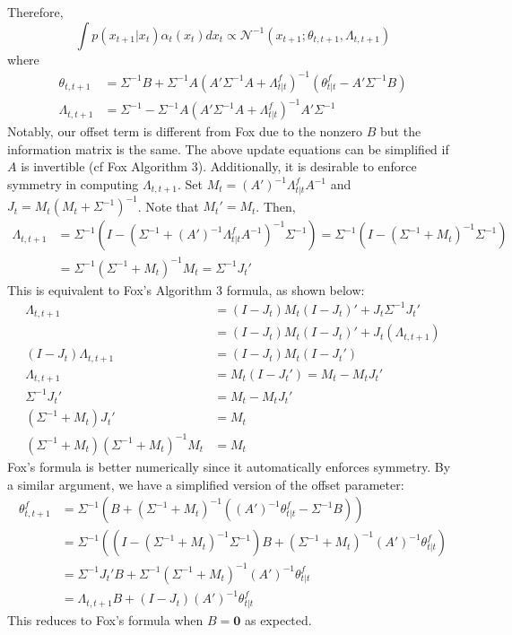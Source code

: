 \documentclass{article} %
\begin{document}
Therefore,
\[\int p(x_{t+1}|x_t)\alpha_t(x_t)dx_t \propto \mathcal{N}^{-1}(x_{t+1};\theta_{t,t+1},\Lambda_{t,t+1})\]
where
\begin{align*}
\theta_{t,t+1} &=\Sigma^{-1}B + \Sigma^{-1}A(A'\Sigma^{-1}A+\Lambda^f_{t|t})^{-1}(\theta^f_{t|t} - A'\Sigma^{-1}B)\\
\Lambda_{t,t+1} &= \Sigma^{-1} - \Sigma^{-1}A(A'\Sigma^{-1}A+\Lambda^f_{t|t})^{-1}A'\Sigma^{-1}
\end{align*}
Notably, our offset term is different from Fox due to the nonzero $B$ but the information matrix is the same. The above update equations can be simplified if $A$ is invertible (cf Fox Algorithm 3). Additionally, it is desirable to enforce symmetry in computing $\Lambda_{t,t+1}$. Set $M_t = (A')^{-1}\Lambda^f_{t|t}A^{-1}$ and $J_t = M_t(M_t+\Sigma^{-1})^{-1}$. Note that $M_t' = M_t$. Then,
\begin{align*}
\Lambda_{t,t+1} &= \Sigma^{-1}\left(I - \left(\Sigma^{-1}+(A')^{-1}\Lambda^f_{t|t}A^{-1}\right)^{-1}\Sigma^{-1}\right) = \Sigma^{-1}\left(I - \left(\Sigma^{-1}+M_t\right)^{-1}\Sigma^{-1}\right)\\
&=\Sigma^{-1}\left(\Sigma^{-1}+M_t\right)^{-1}M_t = \Sigma^{-1}J_t'
\end{align*}
This is equivalent to Fox's Algorithm 3 formula, as shown below:
\begin{align*}
\Lambda_{t,t+1} &= (I-J_t)M_t(I-J_t)' + J_t\Sigma^{-1}J_t'\\
 &= (I-J_t)M_t(I-J_t)' + J_t(\Lambda_{t,t+1})\\
 (I-J_t)\Lambda_{t,t+1} &= (I-J_t)M_t(I-J_t')\\
 \Lambda_{t,t+1} &= M_t(I-J_t') = M_t-M_tJ_t'\\
 \Sigma^{-1}J_t' &= M_t-M_tJ_t'\\
 (\Sigma^{-1} + M_t)J_t' &= M_t\\
 (\Sigma^{-1}+M_t)(\Sigma^{-1}+M_t)^{-1}M_t &= M_t
\end{align*}
Fox's formula is better numerically since it automatically enforces symmetry. By a similar argument, we have a simplified version of the offset parameter:
\begin{align*}
\theta^f_{t,t+1} &= \Sigma^{-1}\left(B+\left(\Sigma^{-1}+M_t\right)^{-1}\left((A')^{-1}\theta^f_{t|t} - \Sigma^{-1}B\right)\right)\\
&= \Sigma^{-1}\left(\left(I-(\Sigma^{-1}+M_t)^{-1}\Sigma^{-1}\right)B + \left(\Sigma^{-1}+M_t\right)^{-1}(A')^{-1}\theta^f_{t|t}\right)\\
&= \Sigma^{-1}J_t'B + \Sigma^{-1}(\Sigma^{-1}+M_t)^{-1}(A')^{-1}\theta^f_{t|t}\\
&= \Lambda_{t,t+1}B + (I-J_t)(A')^{-1}\theta^f_{t|t}
\end{align*}
This reduces to Fox's formula when $B=\mathbf{0}$ as expected.
\end{document}
